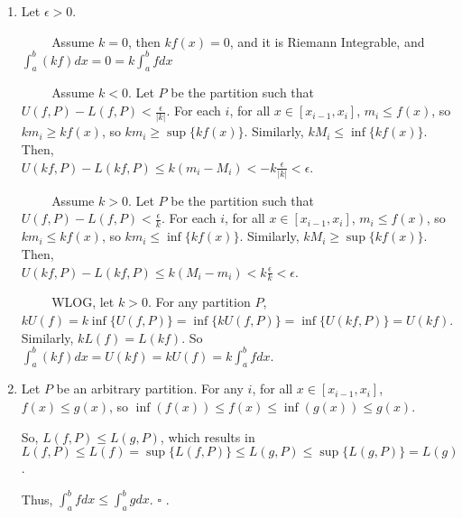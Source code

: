 \documentclass{article}
\begin{document}
\begin{enumerate}
    \item Let $\epsilon > 0$.
    
    $\hspace{1cm}$Assume $k = 0$, then $kf(x) = 0$, and it is Riemann Integrable, and $\int_a^b(kf)dx=0  = k\int_a^bfdx$
    
    $\hspace{1cm}$Assume $k < 0$. Let $P$ be the partition such that $U(f, P) - L(f,P) < \frac{\epsilon}{|k|}$. For each $i$, for all $x \in [x_{i-1}, x_i]$, $m_i \le f(x)$, so $km_i \geq kf(x)$, so $km_i \geq \sup\{kf(x)\}$. Similarly, $kM_i \le \inf \{ kf(x)\}$. Then, \\$U(kf, P) - L(kf, P) \le k(m_i - M_i) < -k\frac{\epsilon}{|k|} < \epsilon$.

    $\hspace{1cm}$Assume $k > 0$. Let $P$ be the partition such that $U(f, P) - L(f,P) < \frac{\epsilon}{k}$. For each $i$, for all $x \in [x_{i-1}, x_i]$, $m_i \le f(x)$, so $km_i \le kf(x)$, so $km_i \le \inf\{kf(x)\}$. Similarly, $kM_i \geq \sup \{ kf(x)\}$. Then, \\$U(kf, P) - L(kf, P) \le k(M_i - m_i) < k\frac{\epsilon}{k} < \epsilon$.

    $\hspace{1cm}$WLOG, let $k > 0$. For any partition $P$, $kU(f) = k\inf\{U(f,P)\} = \inf\{kU(f,P)\} = \inf\{U(kf, P)\} = U(kf)$. Similarly, $kL(f) = L(kf)$. So $\int_a^b(kf)dx = U(kf) = kU(f)= k\int_a^bfdx$.

    \item Let $P$ be an arbitrary partition. For any $i$, for all $x \in [x_{i-1}, x_i]$, \\$f(x) \le g(x)$, so $\inf(f(x)) \le f(x) \le \inf(g(x)) \le g(x)$. 
    
    So, $L(f, P) \le L(g,P)$, which results in \\$L(f,P) \le L(f) = \sup\{L(f, P)\} \le L(g, P) \le \sup\{L(g,P)\} = L(g)$. 
    
    Thus, $\int_a^bfdx\leq\int_a^bgdx$. $\square$
. \end{enumerate}
\end{document}
